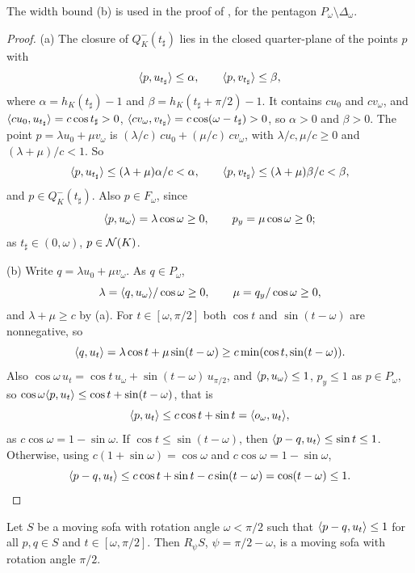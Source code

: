 The width bound (b) is used in the proof of , for the pentagon
$P_\omega\setminus\Delta_\omega$.

\begin{proof}
(a) The closure of $Q^-_K(t_\sharp)$ lies in the closed quarter-plane of the
points $p$ with
\[
  \langle p,u_{t_\sharp}\rangle\le\alpha,\qquad\langle p,v_{t_\sharp}\rangle\le\beta,
\]
where $\alpha=h_K(t_\sharp)-1$ and $\beta=h_K(t_\sharp+\pi/2)-1$. It contains
$cu_0$ and $cv_\omega$, and $\langle cu_0,u_{t_\sharp}\rangle=c\cos t_\sharp>0$,
$\langle cv_\omega,v_{t_\sharp}\rangle=c\cos(\omega-t_\sharp)>0$, so $\alpha>0$ and
$\beta>0$. The point $p=\lambda u_0+\mu v_\omega$ is
$(\lambda/c)\,cu_0+(\mu/c)\,cv_\omega$, with $\lambda/c,\mu/c\ge0$ and
$(\lambda+\mu)/c<1$. So
\[
  \langle p,u_{t_\sharp}\rangle\le(\lambda+\mu)\alpha/c<\alpha,\qquad
  \langle p,v_{t_\sharp}\rangle\le(\lambda+\mu)\beta/c<\beta,
\]
and $p\in Q^-_K(t_\sharp)$. Also $p\in F_\omega$, since
\[
  \langle p,u_\omega\rangle=\lambda\cos\omega\ge0,\qquad p_y=\mu\cos\omega\ge0;
\]
as $t_\sharp\in(0,\omega)$, $p\in\mathcal{N}(K)$.

(b) Write $q=\lambda u_0+\mu v_\omega$. As $q\in P_\omega$,
\[
  \lambda=\langle q,u_\omega\rangle/\cos\omega\ge0,\qquad\mu=q_y/\cos\omega\ge0,
\]
and $\lambda+\mu\ge c$ by (a). For $t\in[\omega,\pi/2]$ both $\cos t$ and
$\sin(t-\omega)$ are nonnegative, so
\[
  \langle q,u_t\rangle=\lambda\cos t+\mu\sin(t-\omega)\ge c\min(\cos t,\sin(t-\omega)).
\]
Also $\cos\omega\,u_t=\cos t\,u_\omega+\sin(t-\omega)\,u_{\pi/2}$, and $\langle p,u_\omega\rangle\le1$, $p_y\le1$ as $p\in P_\omega$, so $\cos\omega\langle p,u_t\rangle\le\cos t+\sin(t-\omega)$, that is
\[
  \langle p,u_t\rangle\le c\cos t+\sin t=\langle o_\omega,u_t\rangle,
\]
as $c\cos\omega=1-\sin\omega$. If $\cos t\le\sin(t-\omega)$, then
$\langle p-q,u_t\rangle\le\sin t\le1$. Otherwise, using $c(1+\sin\omega)=\cos\omega$ and
$c\cos\omega=1-\sin\omega$,
\[
  \langle p-q,u_t\rangle\le c\cos t+\sin t-c\sin(t-\omega)=\cos(t-\omega)\le1 .\qedhere
\]
\end{proof}

\begin{lemma}\label{lem:turn}
Let $S$ be a moving sofa with rotation angle $\omega<\pi/2$ such that
$\langle p-q,u_t\rangle\le1$ for all $p,q\in S$ and $t\in[\omega,\pi/2]$. Then $R_\psi
S$, $\psi=\pi/2-\omega$, is a moving sofa with rotation angle $\pi/2$.
\end{lemma}

